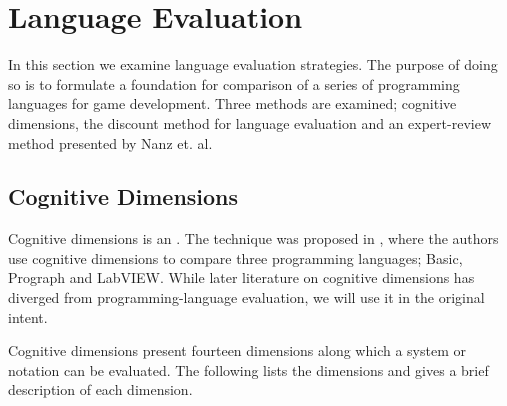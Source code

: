 \section{Language Evaluation} \label{sec:language-evaluation}
In this section we examine language evaluation strategies. The purpose of doing so is to formulate a foundation for comparison of a series of programming languages for game development. 
Three methods are examined; cognitive dimensions\cite{green1996usability}, the discount method for language evaluation\cite{kurtev2016discount} and an expert-review method presented by Nanz et. al\cite{nanz2013benchmarking,nanz2013examining}.

\subsection{Cognitive Dimensions} \label{sec:cog-dim}
Cognitive dimensions is an \textit{} \cite{green1996usability}. The technique was proposed in \cite{green1996usability}, where the authors use cognitive dimensions to compare three programming languages; Basic, Prograph and LabVIEW. While later literature on cognitive dimensions has diverged from programming-language evaluation, we will use it in the original intent.

Cognitive dimensions present fourteen dimensions along which a system or notation can be evaluated. The following lists the dimensions and gives a brief description of each dimension. 

